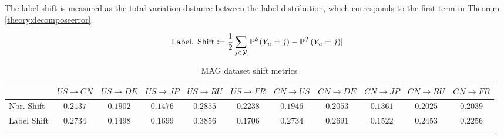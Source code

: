 The label shift is measured as the total variation distance between the label distribution, which corresponds to the first term in Theorem \ref{theory:decomposeerror}.

\begin{align*}
    \text{Label. Shift}\coloneqq\frac{1}{2}\sum_{j\in{\mathcal{Y}}}\lvert\mathbb{P}^\mathcal{S}(Y_u=j) - \mathbb{P}^\mathcal{T}(Y_u=j)\rvert
\end{align*}


\begin{table}[h!]
\caption{MAG dataset shift metrics}
\vspace{2mm}
\begin{center}
\begin{adjustbox}{width = 1\textwidth}
\begin{sc}
\begin{tabular}{lcccccccccc}
\toprule
  &   $US \rightarrow CN$ &  $US\rightarrow DE$  &     $US\rightarrow JP$    & $US\rightarrow RU$     & $US\rightarrow FR$ & $CN \rightarrow US$ &  $CN\rightarrow DE$  &     $CN\rightarrow JP$  & $CN\rightarrow RU$     & $CN\rightarrow FR$\\
\midrule
Nbr. Shift        & $0.2137$ & $0.1902$ & $0.1476$    &$0.2855$    & $0.2238$     &  $0.1946$ & $0.2053$ &$0.1361$ &$0.2025$ & $0.2039$    \\
Label Shift        & $0.2734$ & $0.1498$ & $0.1699$    &$0.3856$    & $0.1706$     &  $0.2734$ & $0.2691$ &$0.1522$ &$0.2453$ & $0.2256$    \\

\bottomrule
\label{table:magstats}
\end{tabular}
\end{sc}
\end{adjustbox}
\end{center}
\vskip -0.7cm
\end{table}


